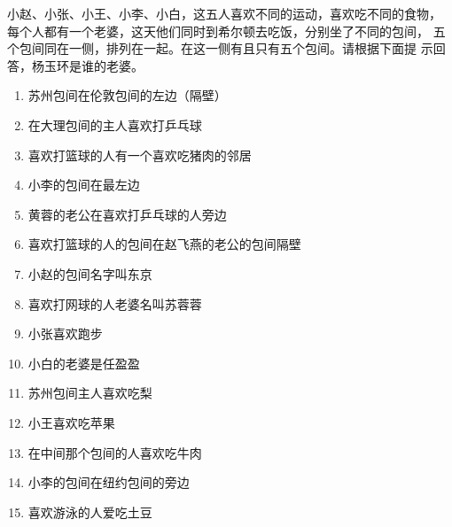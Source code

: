 \begin{question}
  小赵、小张、小王、小李、小白，这五人喜欢不同的运动，喜欢吃不同的食物，
  每个人都有一个老婆，这天他们同时到希尔顿去吃饭，分别坐了不同的包间，
  五个包间同在一侧，排列在一起。在这一侧有且只有五个包间。请根据下面提
  示回答，杨玉环是谁的老婆。

  \begin{enumerate}
  \item 苏州包间在伦敦包间的左边（隔壁）
  \item 在大理包间的主人喜欢打乒乓球
  \item 喜欢打篮球的人有一个喜欢吃猪肉的邻居
  \item 小李的包间在最左边
  \item 黄蓉的老公在喜欢打乒乓球的人旁边
  \item 喜欢打篮球的人的包间在赵飞燕的老公的包间隔壁
  \item 小赵的包间名字叫东京
  \item 喜欢打网球的人老婆名叫苏蓉蓉
  \item 小张喜欢跑步
  \item 小白的老婆是任盈盈
  \item 苏州包间主人喜欢吃梨
  \item 小王喜欢吃苹果
  \item 在中间那个包间的人喜欢吃牛肉
  \item 小李的包间在纽约包间的旁边
  \item 喜欢游泳的人爱吃土豆
  \end{enumerate}
\end{question}

